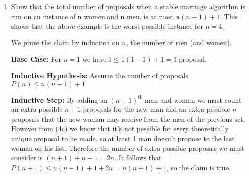 \documentclass[11pt,fleqn]{article}
\begin{document}
\begin{enumerate}
\begin{enumerate}
\item Show that the total number of proposals when a stable marriage algorithm is run on an instance of n women and n men, is at most $n(n-1)+1$. This shows that the above example is the worst possible instance for $n=4$. 

We prove the claim by induction on $n$, the number of men (and women).

{\bf Base Case:} For $n=1$ we have $1 \leq 1(1-1)+1 = 1$ proposal.

{\bf Inductive Hypothesis:} Assume the number of proposals $P(n) \leq n(n-1)+1$

{\bf Inductive Step:} By adding an $(n+1)^\text{th}$ man and woman we must count an extra possible $n+1$ proposals for the new man and an extra possible $n$ proposals that the new woman may receive from the men of the previous set. However from (4c) we know that it's not possible for every theoretically unique proposal to be made, so at least 1 man doesn't propose to the last woman on his list. Therefore the number of extra possible proposals we must consider is $(n+1)+n-1 = 2n$. It follows that $P(n+1) \leq n(n-1)+1+2n = n(n+1)+1$, so the claim is true.

\end{enumerate}

\end{enumerate}
\end{document}
